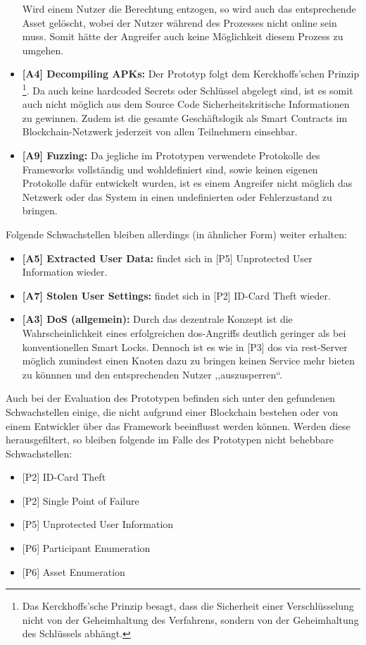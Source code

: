 \begin{itemize}[leftmargin=0cm,label={}]
        Wird einem Nutzer die Berechtung entzogen, so wird auch das entsprechende Asset gelöscht, wobei der Nutzer während des Prozesses nicht online sein muss. 
        Somit hätte der Angreifer auch keine Möglichkeit diesem Prozess zu umgehen.
        \item \textbf{[A4] Decompiling APKs:} Der Prototyp folgt dem Kerckhoffs'schen Prinzip
        \!\footnote{Das Kerckhoffs'sche Prinzip besagt, dass die Sicherheit einer Verschlüsselung nicht von der Geheimhaltung des Verfahrens, sondern von der Geheimhaltung des Schlüssels abhängt.}. 
        Da auch keine hardcoded Secrets oder Schlüssel abgelegt sind, ist es somit auch nicht möglich aus dem Source Code Sicherheitskritische Informationen zu gewinnen. 
        Zudem ist die gesamte Geschäftslogik als Smart Contracts im Blockchain-Netzwerk jederzeit von allen Teilnehmern einsehbar.
        \item \textbf{[A9] Fuzzing:} Da jegliche im Prototypen verwendete Protokolle des Frameworks vollständig und wohldefiniert sind, sowie keinen eigenen Protokolle dafür entwickelt wurden, ist es einem Angreifer nicht möglich das Netzwerk oder das System in einen undefinierten oder Fehlerzustand zu bringen.
    \end{itemize}
    \medskip
    Folgende Schwachstellen bleiben allerdings (in ähnlicher Form) weiter erhalten:
    \begin{itemize}[leftmargin=0cm,label={}]
        \item \textbf{[A5] Extracted User Data:} findet sich in [P5] Unprotected User Information wieder.
        \item \textbf{[A7] Stolen User Settings:} findet sich in [P2] ID-Card Theft wieder.
        \item \textbf{[A3] DoS (allgemein):} Durch das dezentrale Konzept ist die Wahrscheinlichkeit eines erfolgreichen \gls{dos}-Angriffs deutlich geringer als bei konventionellen Smart Locks. 
        Dennoch ist es wie in [P3] \gls{dos} via \gls{rest}-Server möglich zumindest einen Knoten dazu zu bringen keinen Service mehr bieten zu könnnen und den entsprechenden Nutzer ,,auszusperren``.
    \end{itemize}
    \medskip
    Auch bei der Evaluation des Prototypen befinden sich unter den gefundenen Schwachstellen einige, die nicht aufgrund einer Blockchain bestehen oder von einem Entwickler über das Framework beeinflusst werden können. 
    Werden diese herausgefiltert, so bleiben folgende im Falle des Prototypen nicht behebbare Schwachstellen:
    \begin{itemize}[noitemsep]
        \item {[P2]} ID-Card Theft
        \item {[P2]} Single Point of Failure
        \item {[P5]} Unprotected User Information
        \item {[P6]} Participant Enumeration
        \item {[P6]} Asset Enumeration
    \end{itemize}
    